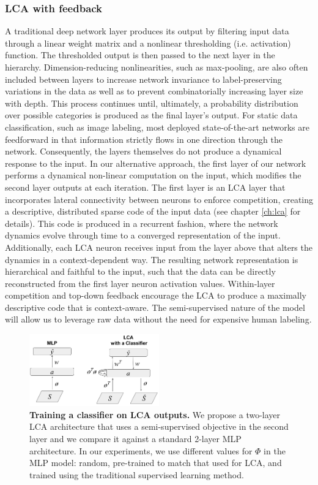 \subsubsection{LCA with feedback}
A traditional deep network layer produces its output by filtering input data through a linear weight matrix and a nonlinear thresholding (i.e. activation) function. The thresholded output is then passed to the next layer in the hierarchy. Dimension-reducing nonlinearities, such as max-pooling, are also often included between layers to increase network invariance to label-preserving variations in the data as well as to prevent combinatorially increasing layer size with depth. This process continues until, ultimately, a probability distribution over possible categories is produced as the final layer’s output. For static data classification, such as image labeling, most deployed state-of-the-art networks are feedforward in that information strictly flows in one direction through the network. Consequently, the layers themselves do not produce a dynamical response to the input. In our alternative approach, the first layer of our network performs a dynamical non-linear computation on the input, which modifies the second layer outputs at each iteration. The first layer is an LCA layer that incorporates lateral connectivity between neurons to enforce competition, creating a descriptive, distributed sparse code of the input data (see chapter \ref{ch:lca} for details). This code is produced in a recurrent fashion, where the network dynamics evolve through time to a converged representation of the input. Additionally, each LCA neuron receives input from the layer above that alters the dynamics in a context-dependent way. The resulting network representation is hierarchical and faithful to the input, such that the data can be directly reconstructed from the first layer neuron activation values. Within-layer competition and top-down feedback encourage the LCA to produce a maximally descriptive code that is context-aware. The semi-supervised nature of the model will allow us to leverage raw data without the need for expensive human labeling.

\begin{figure}[h]
    \centering
    \includegraphics[width=0.5\textwidth]{figures/mlp_lcaf_architectures.png}
    \caption{\textbf{Training a classifier on LCA outputs.} We propose a two-layer LCA architecture that uses a semi-supervised objective in the second layer and we compare it against a standard 2-layer MLP architecture. In our experiments, we use different values for $\Phi$ in the MLP model: random, pre-trained to match that used for LCA, and trained using the traditional supervised learning method.}
    \label{fig:ch3_mlp_lcaf_architectures}
\end{figure}

